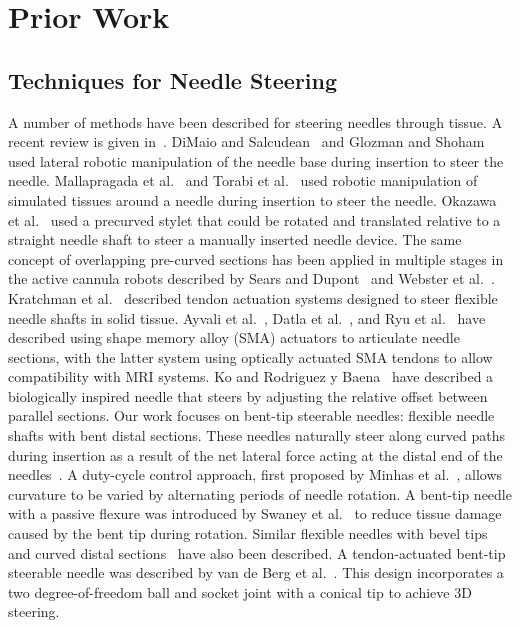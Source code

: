\section{Prior Work}

\subsection{Techniques for Needle Steering}
A number of methods have been described for steering needles through tissue. A recent review is given in~\cite{vandeBerg2014}. DiMaio and Salcudean~\cite{DiMaio2005} and Glozman and Shoham~\cite{Glozman2007} used lateral robotic manipulation of the needle base during insertion to steer the needle. Mallapragada et al.~\cite{Mallapragada2009} and Torabi et al.~\cite{Torabi2009} used robotic manipulation of simulated tissues around a needle during insertion to steer the needle. Okazawa et al.~\cite{Okazawa2005} used a precurved stylet that could be rotated and translated relative to a straight needle shaft to steer a manually inserted needle device. The same concept of overlapping pre-curved sections has been applied in multiple stages in the active cannula robots described by Sears and Dupont~\cite{Sears2006} and Webster et al.~\cite{Webster2009}. Kratchman et al.~\cite{Kratchman2011} described tendon actuation systems designed to steer flexible needle shafts in solid tissue. Ayvali et al.~\cite{Ayvali2012}, Datla et al.~\cite{Datla2014}, and Ryu et al.~\cite{Ryu2014} have described using shape memory alloy (SMA) actuators to articulate needle sections, with the latter system using optically actuated SMA tendons to allow compatibility with MRI systems. Ko and Rodriguez y Baena~\cite{Ko2013} have described a biologically inspired needle that steers by adjusting the relative offset between parallel sections. Our work focuses on bent-tip steerable needles: flexible needle shafts with bent distal sections. These needles naturally steer along curved paths during insertion as a result of the net lateral force acting at the distal end of the needles~\cite{Webster2006}. A duty-cycle control approach, first proposed by Minhas et al.~\cite{Minhas2007}, allows curvature to be varied by alternating periods of needle rotation. A bent-tip needle with a passive flexure was introduced by Swaney et al.~\cite{Swaney2013} to reduce tissue damage caused by the bent tip during rotation. Similar flexible needles with bevel tips~\cite{OLeary2003,Alterovitz2005} and curved distal sections~\cite{Wedlick2009} have also been described. A tendon-actuated bent-tip steerable needle was described by van de Berg et al.~\cite{vandeBerg2015}. This design incorporates a two degree-of-freedom ball and socket joint with a conical tip to achieve 3D steering.

